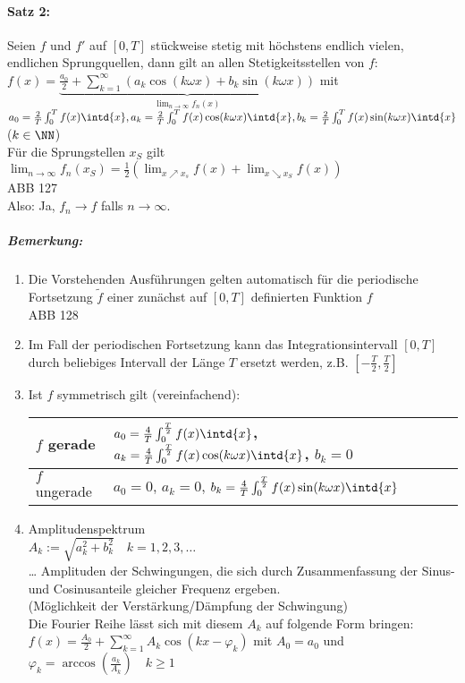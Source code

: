 \begin{enumerate}
\paragraph{Satz 2:} Seien $f$ und $f'$ auf $[0,T]$ stückweise stetig mit höchstens endlich vielen, endlichen Sprungquellen, dann gilt an allen Stetigkeitsstellen von $f$: \\
$f(x) = \underbrace{\frac{a_0}{2}+\sum_{k=1}^{\infty} (a_k \cos (k\omega x) + b_k \sin (k \omega x) )}_{\lim_{n\to\infty} f_n(x)}$ mit\\
 $a_0 = \frac{2}{T}\int_0^T f(x) \intd{x},\\
a_k = \frac{2}{T}\int_0^T f(x) \cos (k \omega x) \intd{x}, \\
b_k = \frac{2}{T} \int_0^T f(x) \sin (k \omega x) \intd{x}$ \qquad ($k\in \NN$)\\
Für die Sprungstellen $x_S$ gilt $\lim_{n\to\infty} f_n(x_S) = \frac{1}{2}\left( \lim_{x\nearrow x_s} f(x) + \lim_{x \searrow x_S} f(x)\right)$\\
ABB 127\\
Also: Ja, $f_n\to f$ falls $n\to \infty$.
\subparagraph{Bemerkung:} 
\begin{enumerate}
\item Die Vorstehenden Ausführungen gelten automatisch für die periodische Fortsetzung $\tilde f$ einer zunächst auf $[0,T]$ definierten Funktion $f$\\
ABB 128
\item Im Fall der periodischen Fortsetzung kann das Integrationsintervall $[0,T]$ durch beliebiges Intervall der Länge $T$ ersetzt werden, z.B. $\left[-\frac{T}{2}, \frac{T}{2}\right]$
\item Ist $f$ symmetrisch gilt (vereinfachend):\\
\begin{tabular}{l | l l l }
$f$ gerade & $a_0 = \frac{4}{T}\int_0^{\frac{T}{2}}f(x) \intd{x}$, $ a_k = \frac{4}{T}\int_0^{\frac{T}{2}}f(x) \cos (k\omega x) \intd{x}$, $ b_k =0$\\
\hline
$f$ ungerade & $a_0=0$, $a_k = 0$, $b_k = \frac{4}{T}\int_0^{\frac{T}{2}}f(x) \sin (k\omega x) \intd{x}$
\end{tabular}  
\item Amplitudenspektrum\\
$A_k := \sqrt{a_k^2+b_k^2}\quad k=1,2,3,\dots$\\
… Amplituden der Schwingungen, die sich durch Zusammenfassung der Sinus- und Cosinusanteile gleicher Frequenz ergeben.\\
(Möglichkeit der Verstärkung/Dämpfung der Schwingung)\\
Die Fourier Reihe lässt sich mit diesem $A_k$ auf folgende Form bringen:\\
$f(x)=\frac{A_0}{2}+\sum_{k=1}^{\infty} A_k \cos (k x - \varphi_k)$ mit $A_0=a_0$ und $\varphi_k = \arccos \left( \frac{a_k}{A_k}\right) \quad k\geq 1$
\end{enumerate}
\end{enumerate}

